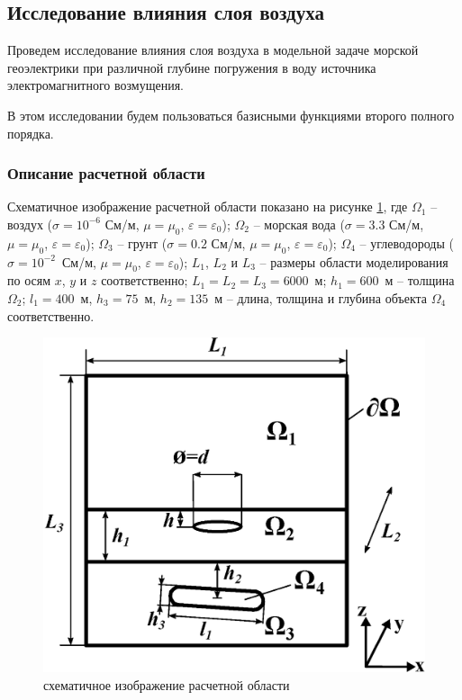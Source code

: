 \documentclass[a4paper,12pt]{article}
\begin{document}
\subsection{Исследование влияния слоя воздуха}

Проведем исследование влияния слоя воздуха в модельной задаче морской геоэлектрики при различной глубине погружения в воду источника электромагнитного возмущения.

В этом исследовании будем пользоваться базисными функциями второго полного порядка.

\subsubsection{Описание расчетной области}
Схематичное изображение расчетной области показано на рисунке \ref{fig:res1:area}, где $\Omega_1$ -- воздух ($\sigma=10^{-6}$ См/м, $\mu=\mu_0$, $\varepsilon=\varepsilon_0$); $\Omega_2$ -- морская вода ($\sigma=3.3$ См/м, $\mu=\mu_0$, $\varepsilon=\varepsilon_0$); $\Omega_3$ -- грунт ($\sigma=0.2$ См/м, $\mu=\mu_0$, $\varepsilon=\varepsilon_0$); $\Omega_4$ -- углеводороды ($\sigma=10^{-2}$~См/м, $\mu=\mu_0$, $\varepsilon=\varepsilon_0$); $L_1$, $L_2$ и $L_3$ -- размеры области моделирования по осям $x$, $y$ и $z$ соответственно; $L_1 = L_2 = L_3 = 6000$~м; $h_1=600$~м -- толщина $\Omega_2$; $l_1=400$~м, $h_3=75$~м, $h_2=135$~м -- длина, толщина и глубина объекта $\Omega_4$ соответственно.

\begin{figure}[H]
	\centering
	\includegraphics[scale=0.5]{research-1/area_3layers_shift_3.eps}
	\caption{схематичное изображение расчетной области}
	\label{fig:res1:area}
\end{figure}
\end{document}
